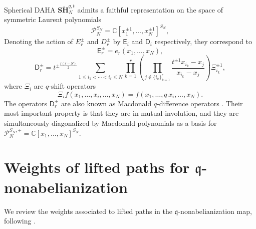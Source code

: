 \documentclass{article}
\numberwithin{equation}{section}
\newcommand{\IC}{\mathbb{C}}
\newcommand{\mq}{\mathfrak{q}}
\def\be{\begin{equation}}
\def\ee{\end{equation}}
\def\IC{{\mathbb{C}}}
\def\CP{{\mathcal{P}}}
\def\sfD{\mathsf{D}}
\def\sfE{\mathsf{E}}
\newcommand{\SH}{{\mathbf{S}\ddot{\mathbf{H}}}}
\begin{document}
Spherical DAHA  $\SH_N^{q,t}$ admits a faithful representation on the space of symmetric Laurent polynomials
\be\label{eq:DAHA-P-mod}
	\CP_N^{S_N} = \IC[x_1^{\pm 1}, \dots, x_{N}^{\pm1}]^{S_N},
\ee
Denoting the action of $E_{r}^{\pm}$ and $D_r^{\pm}$  by $\sfE_i$ and $\sfD_i$ respectively, they correspond to
\begin{equation}
\label{eq:SH-X-generators}
    \sfE_r^{\pm} = e_r(x_1,\dots,x_N),
\end{equation}
\begin{equation}
    \label{eq:Macdonald-ops}
    \sfD_r^\pm  = t^{\pm\frac{r(r-N)}{2}}\sum_{1\leq i_1 < \cdots<i_r\leq N}\prod_{k=1}^r\left(\prod_{j \notin \{i_k\}_{k=1}^r}\frac{t^{\pm 1} x_{i_k}-x_j}{x_{i_k}-x_j}\right)\Xi_{i_k}^{\pm 1},
\end{equation}
where $\Xi_i$ are $q$-shift operators
\be
	\Xi_i f(x_1,\dots, x_i,\dots,x_N) = f(x_1,\dots, q\,x_i,\dots,x_N).
\ee
The operators $\sfD_r^\pm$ are also known as Macdonald $q$-difference operators \cite{macdonald1998symmetric}. Their most important property is that they are in mutual involution, and they are simultaneously diagonalized by Macdonald polynomials as a basis for $\CP_N^{S_N,+} = \IC[x_1, \dots, x_{N}]^{S_N}$.






\section{Weights of lifted paths for $\mq$-nonabelianization}\label{app:q-nonabelianization-weights}
We review the weights associated to lifted paths in the $\mq$-nonabelianization map, following \cite{Neitzke:2020jik}.
\end{document}
